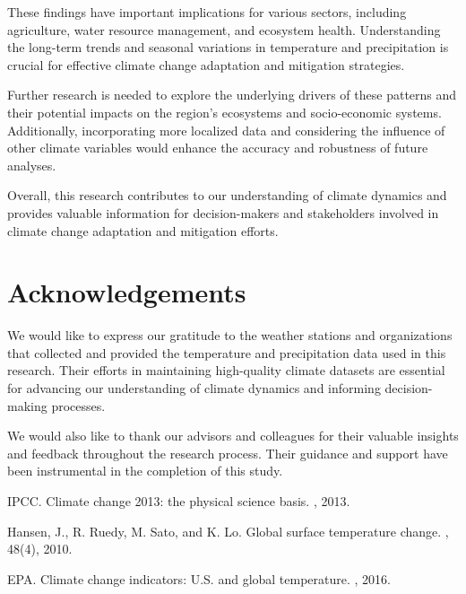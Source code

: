 \documentclass{article}
\begin{document}
\begin{enumerate}
These findings have important implications for various sectors, including agriculture, water resource management, and ecosystem health. Understanding the long-term trends and seasonal variations in temperature and precipitation is crucial for effective climate change adaptation and mitigation strategies.

Further research is needed to explore the underlying drivers of these patterns and their potential impacts on the region's ecosystems and socio-economic systems. Additionally, incorporating more localized data and considering the influence of other climate variables would enhance the accuracy and robustness of future analyses.

Overall, this research contributes to our understanding of climate dynamics and provides valuable information for decision-makers and stakeholders involved in climate change adaptation and mitigation efforts.

\section{Acknowledgements}

We would like to express our gratitude to the weather stations and organizations that collected and provided the temperature and precipitation data used in this research. Their efforts in maintaining high-quality climate datasets are essential for advancing our understanding of climate dynamics and informing decision-making processes.

We would also like to thank our advisors and colleagues for their valuable insights and feedback throughout the research process. Their guidance and support have been instrumental in the completion of this study.

\begin{thebibliography}{10}

IPCC.
\newblock Climate change 2013: the physical science basis.
, 2013.

Hansen, J., R. Ruedy, M. Sato, and K. Lo.
\newblock Global surface temperature change.
, 48(4), 2010.

EPA.
\newblock Climate change indicators: U.S. and global temperature.
, 2016.


\end{thebibliography}
\end{enumerate}
\end{document}
